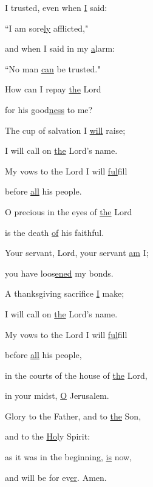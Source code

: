 \noindent I trusted, even when \uline{I} said:~\GreStar{}~\nopagebreak

``I am sore\uline{ly} afflicted,"

\noindent and when I said in my \uline{a}larm:~\GreStar{}~\nopagebreak

``No man \uline{can} be trusted."

\noindent How can I repay \uline{the} Lord~\GreStar{}~\nopagebreak

for his good\uline{ness} to me?

\noindent The cup of salvation I \uline{will} raise;~\GreStar{}~\nopagebreak

I will call on \uline{the} Lord’s name.

\noindent My vows to the Lord I will \uline{ful}fill~\GreStar{}~\nopagebreak

before \uline{all} his people.

\noindent O precious in the eyes of \uline{the} Lord~\GreStar{}~\nopagebreak

is the death \uline{of} his faithful.

\noindent Your servant, Lord, your servant \uline{am} I;~\GreStar{}~\nopagebreak

you have loos\uline{ened} my bonds.

\noindent A thanksgiving sacrifice \uline{I} make;~\GreStar{}~\nopagebreak

I will call on \uline{the} Lord’s name.

\noindent My vows to the Lord I will \uline{ful}fill~\GreStar{}~\nopagebreak

before \uline{all} his people,

\noindent in the courts of the house of \uline{the} Lord,~\GreStar{}~\nopagebreak

in your midst, \uline{O} Jerusalem.

\noindent Glory to the Father, and to \uline{the} Son,~\GreStar{}~\nopagebreak

and to the \uline{Ho}ly Spirit:

\noindent as it was in the beginning, \uline{is} now,~\GreStar{}~\nopagebreak

and will be for ev\uline{er}. Amen.
